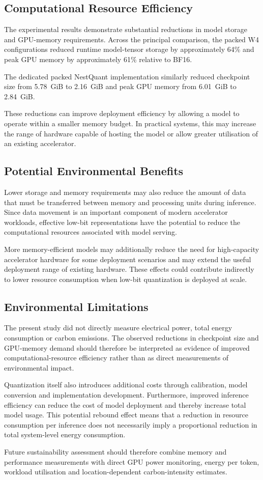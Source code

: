 \subsection{Computational Resource Efficiency}

The experimental results demonstrate substantial reductions in model
storage and GPU-memory requirements. Across the principal comparison,
the packed W4 configurations reduced runtime model-tensor storage by
approximately 64\% and peak GPU memory by approximately 61\% relative
to BF16.

The dedicated packed NestQuant implementation similarly reduced
checkpoint size from 5.78~GiB to 2.16~GiB and peak GPU memory from
6.01~GiB to 2.84~GiB.

These reductions can improve deployment efficiency by allowing a model
to operate within a smaller memory budget. In practical systems, this
may increase the range of hardware capable of hosting the model or allow
greater utilisation of an existing accelerator.


\subsection{Potential Environmental Benefits}

Lower storage and memory requirements may also reduce the amount of data
that must be transferred between memory and processing units during
inference. Since data movement is an important component of modern
accelerator workloads, effective low-bit representations have the
potential to reduce the computational resources associated with model
serving.

More memory-efficient models may additionally reduce the need for
high-capacity accelerator hardware for some deployment scenarios and
may extend the useful deployment range of existing hardware. These
effects could contribute indirectly to lower resource consumption when
low-bit quantization is deployed at scale.


\subsection{Environmental Limitations}

The present study did not directly measure electrical power, total
energy consumption or carbon emissions. The observed reductions in
checkpoint size and GPU-memory demand should therefore be interpreted as
evidence of improved computational-resource efficiency rather than as
direct measurements of environmental impact.

Quantization itself also introduces additional costs through calibration,
model conversion and implementation development. Furthermore, improved
inference efficiency can reduce the cost of model deployment and thereby
increase total model usage. This potential rebound effect means that a
reduction in resource consumption per inference does not necessarily
imply a proportional reduction in total system-level energy consumption.

Future sustainability assessment should therefore combine memory and
performance measurements with direct GPU power monitoring, energy per
token, workload utilisation and location-dependent carbon-intensity
estimates.